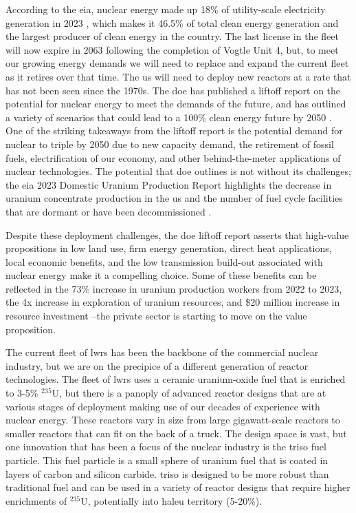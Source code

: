 According to the \gls{eia}, nuclear energy made up 18\% of utility-scale electricity generation in 2023 \cite{eia_elec_gen_2024}, which makes it 46.5\% of total clean energy generation and the largest producer of clean energy in the country. The last license in the fleet will now expire in 2063 following the completion of Vogtle Unit 4, but, to meet our growing energy demands we will need to replace and expand the current fleet as it retires over that time. The \gls{us} will need to deploy new reactors at a rate that has not been seen since the 1970s. The \gls{doe} has published a liftoff report on the potential for nuclear energy to meet the demands of the future, and has outlined a variety of scenarios that could lead to a 100\% clean energy future by 2050 \cite{julie_liftoff_pathways_2024}. One of the striking takeaways from the liftoff report is the potential demand for nuclear to triple by 2050 due to new capacity demand, the retirement of fossil fuels, electrification of our economy, and other behind-the-meter applications of nuclear technologies. The potential that \gls{doe} outlines is not without its challenges; the \gls{eia} 2023 Domestic Uranium Production Report highlights the decrease in uranium concentrate production in the \gls{us} and the number of fuel cycle facilities that are dormant or have been decommissioned \cite{eia_uranium_statistics_2023}.

Despite these deployment challenges, the \gls{doe} liftoff report asserts that high-value propositions in low land use, firm energy generation, direct heat applications, local economic benefits, and the low transmission build-out associated with nuclear energy make it a compelling choice. Some of these benefits can be reflected in the 73\% increase in uranium production workers from 2022 to 2023, the 4x increase in exploration of uranium resources, and \$20 million increase in resource investment \cite{eia_uranium_statistics_2023}--the private sector is starting to move on the value proposition.

The current fleet of \gls{lwr}s has been the backbone of the commercial nuclear industry, but we are on the precipice of a different generation of reactor technologies. The fleet of \gls{lwr}s uses a ceramic uranium-oxide fuel that is enriched to 3-5\% $^{235}$U, but there is a panoply of advanced reactor designs that are at various stages of deployment making use of our decades of experience with nuclear energy. These reactors vary in size from large gigawatt-scale reactors to smaller reactors that can fit on the back of a truck. The design space is vast, but one innovation that has been a focus of the nuclear industry is the \gls{triso} fuel particle. This fuel particle is a small sphere of uranium fuel that is coated in layers of carbon and silicon carbide. \gls{triso} is designed to be more robust than traditional fuel and can be used in a variety of reactor designs that require higher enrichments of $^{235}$U, potentially into \gls{haleu} territory (5-20\%).


